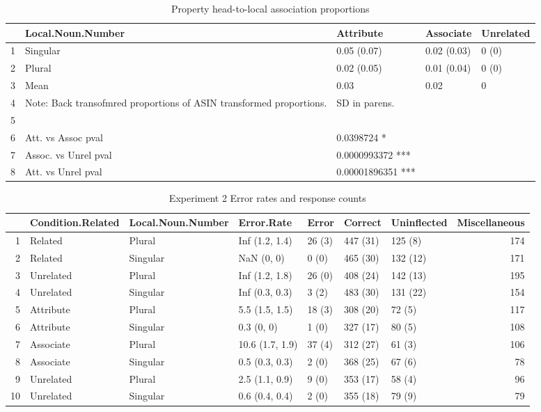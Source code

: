\documentclass[a4paper,11pt]{article}\usepackage[]{graphicx}\usepackage[]{color}
\begin{document}
\begin{landscape}
\begin{table}[ht]
\centering
\begin{tabular}{rllll}
  \hline
 & Local.Noun.Number & Attribute & Associate & Unrelated \\ 
  \hline
1 & Singular & 0.05 (0.07) & 0.02 (0.03) & 0 (0) \\ 
  2 & Plural & 0.02 (0.05) & 0.01 (0.04) & 0 (0) \\ 
  3 & Mean & 0.03 & 0.02 & 0 \\ 
  4 & Note: Back transofmred proportions of ASIN transformed proportions. & SD in parens. &  &  \\ 
  5 &  &  &  &  \\ 
  6 & Att. vs Assoc pval & 0.0398724 * &  &  \\ 
  7 & Assoc. vs Unrel pval & 0.0000993372 *** &  &  \\ 
  8 & Att. vs Unrel pval & 0.00001896351 *** &  &  \\ 
   \hline
\end{tabular}
\caption[PROP association]{Property head-to-local association proportions} 
\end{table}


\begin{table}[ht]
\centering
\begin{tabular}{rllllllr}
  \hline
 & Condition.Related & Local.Noun.Number & Error.Rate & Error & Correct & Uninflected & Miscellaneous \\ 
  \hline
1 & Related & Plural & Inf (1.2, 1.4) & 26 (3) & 447 (31) & 125 (8) & 174 \\ 
  2 & Related & Singular & NaN (0, 0) & 0 (0) & 465 (30) & 132 (12) & 171 \\ 
  3 & Unrelated & Plural & Inf (1.2, 1.8) & 26 (0) & 408 (24) & 142 (13) & 195 \\ 
  4 & Unrelated & Singular & Inf (0.3, 0.3) & 3 (2) & 483 (30) & 131 (22) & 154 \\ 
  5 & Attribute & Plural & 5.5 (1.5, 1.5) & 18 (3) & 308 (20) & 72 (5) & 117 \\ 
  6 & Attribute & Singular & 0.3 (0, 0) & 1 (0) & 327 (17) & 80 (5) & 108 \\ 
  7 & Associate  & Plural & 10.6 (1.7, 1.9) & 37 (4) & 312 (27) & 61 (3) & 106 \\ 
  8 & Associate  & Singular & 0.5 (0.3, 0.3) & 2 (0) & 368 (25) & 67 (6) &  78 \\ 
  9 & Unrelated & Plural & 2.5 (1.1, 0.9) & 9 (0) & 353 (17) & 58 (4) &  96 \\ 
  10 & Unrelated & Singular & 0.6 (0.4, 0.4) & 2 (0) & 355 (18) & 79 (9) &  79 \\ 
   \hline
\end{tabular}
\caption[Exp. 2 Error rates]{Experiment 2 Error rates and response counts} 
\end{table}

\end{landscape}
\end{document}
